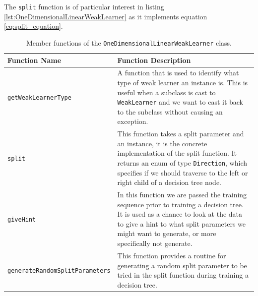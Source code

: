 \documentclass[12pt,twoside,notitlepage]{report}
\begin{document}
                The \texttt{split} function is of particular interest in listing \ref{lst:OneDimensionalLinearWeakLearner} as 
                it implements equation \ref{eq:split_equation}. 

                \begin{table}[H]
                    \begin{tabularx}{\textwidth}{l|X}
                        \textbf{Function Name} & \textbf{Function Description} \\
                        \hline

                        \texttt{getWeakLearnerType} & 
                            A function that is used to identify what type of weak learner an instance is. This is 
                            useful when a subclass is cast to \texttt{WeakLearner} and we want to cast it back to 
                            the subclass without causing an exception. \\ 
                        \hline

                        \texttt{split} & 
                            This function takes a split parameter and an instance, it is the concrete implementation 
                            of the split function. It returns an enum of type \texttt{Direction}, which specifies if 
                            we should traverse to the left or right child of a decision tree node. \\ 
                        \hline

                        \texttt{giveHint} & 
                            In this function we are passed the training sequence prior to training a decision tree. 
                            It is used as a chance to look at the data to give a hint to what split parameters we 
                            might want to generate, or more specifically not generate. \\ 
                        \hline

                        \texttt{generateRandomSplitParameters} & 
                            This function provides a routine for generating a random split parameter to be tried in the 
                            split function during training a decision tree. \\ 

                    \end{tabularx}
                    \caption{Member functions of the \texttt{OneDimensionalLinearWeakLearner} class.}
                    \label{tab:OneDimensionalLinearWeakLearner}
                \end{table}
\end{document}
